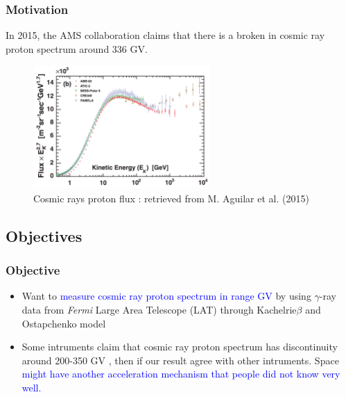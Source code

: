 \documentclass{beamer}
\begin{document}
\begin{frame}
\frametitle{Motivation}
In 2015, the AMS collaboration claims that there is a broken in cosmic ray proton spectrum around 336 GV.
\begin{figure}
  \includegraphics[width=0.6\textwidth]{proton_spectrum}
  \caption{Cosmic rays proton flux : retrieved from M. Aguilar et al. (2015)}
\end{figure}
\end{frame}

\subsection{Objectives}

\begin{frame}
\frametitle{Objective}
\begin{itemize}
  \item Want to \textcolor{blue}{measure cosmic ray proton spectrum in range GV} by using
  $\gamma$-ray data from \textit{Fermi} Large Area Telescope (LAT) through Kachelrie$\beta$ and Ostapchenko model
  \item Some intruments claim that cosmic ray proton spectrum has discontinuity around 200-350 GV
  , then if our result agree with other intruments. Space \textcolor{blue}{might have another acceleration mechanism that people did not know very well.}
\end{itemize}
\end{frame}
\end{document}
